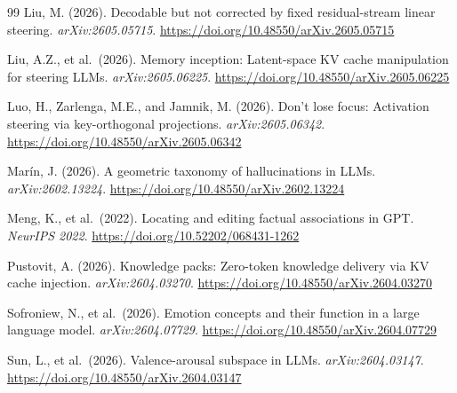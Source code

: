 \documentclass[11pt,letterpaper]{article}
\DeclareRobustCommand{\_}{\textunderscore\allowbreak}
\begin{document}
\begin{thebibliography}{99}
Liu, M. (2026).
\newblock Decodable but not corrected by fixed residual-stream linear steering.
\newblock \textit{arXiv:2605.05715}.
\newblock \url{https://doi.org/10.48550/arXiv.2605.05715}

Liu, A.Z., et al.\ (2026).
\newblock Memory inception: Latent-space {KV} cache manipulation for steering {LLMs}.
\newblock \textit{arXiv:2605.06225}.
\newblock \url{https://doi.org/10.48550/arXiv.2605.06225}

Luo, H., Zarlenga, M.E., and Jamnik, M. (2026).
\newblock Don't lose focus: Activation steering via key-orthogonal projections.
\newblock \textit{arXiv:2605.06342}.
\newblock \url{https://doi.org/10.48550/arXiv.2605.06342}

Marín, J. (2026).
\newblock A geometric taxonomy of hallucinations in {LLMs}.
\newblock \textit{arXiv:2602.13224}.
\newblock \url{https://doi.org/10.48550/arXiv.2602.13224}

Meng, K., et al.\ (2022).
\newblock Locating and editing factual associations in {GPT}.
\newblock \textit{NeurIPS 2022}.
\newblock \url{https://doi.org/10.52202/068431-1262}

Pustovit, A. (2026).
\newblock Knowledge packs: Zero-token knowledge delivery via {KV} cache injection.
\newblock \textit{arXiv:2604.03270}.
\newblock \url{https://doi.org/10.48550/arXiv.2604.03270}

Sofroniew, N., et al.\ (2026).
\newblock Emotion concepts and their function in a large language model.
\newblock \textit{arXiv:2604.07729}.
\newblock \url{https://doi.org/10.48550/arXiv.2604.07729}

Sun, L., et al.\ (2026).
\newblock Valence-arousal subspace in {LLMs}.
\newblock \textit{arXiv:2604.03147}.
\newblock \url{https://doi.org/10.48550/arXiv.2604.03147}

\end{thebibliography}
\end{document}
